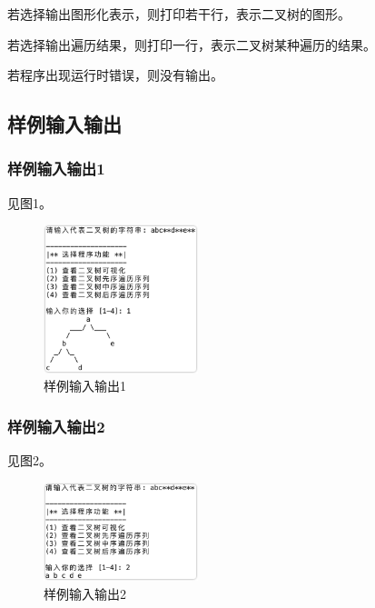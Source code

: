 \documentclass{article}
\begin{document}
若选择输出图形化表示，则打印若干行，表示二叉树的图形。

若选择输出遍历结果，则打印一行，表示二叉树某种遍历的结果。

若程序出现运行时错误，则没有输出。

\subsection{样例输入输出}

\subsubsection{样例输入输出1}

见图1。

\begin{figure}[htbp]

    \centering\includegraphics[width=0.4\textwidth]{./Images/sample1.png}

    \caption{样例输入输出1}

\end{figure}

\subsubsection{样例输入输出2}

见图2。

\begin{figure}[htbp]

    \centering\includegraphics[width=0.4\textwidth]{./Images/sample2.png}

    \caption{样例输入输出2}

\end{figure}
\end{document}
